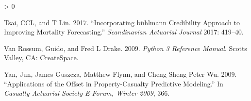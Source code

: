 \documentclass[
]{article}
\newlength{\cslhangindent}
\newenvironment{CSLReferences}[2] %
 {%
  \setlength{\parindent}{0pt}
  \ifodd #1 \everypar{\setlength{\hangindent}{\cslhangindent}}\ignorespaces\fi
  \ifnum #2 > 0
  \setlength{\parskip}{#2\baselineskip}
  \fi
 }%
 {}
\begin{document}
\begin{CSLReferences}{1}{0}
\leavevmode\hypertarget{ref-tsai2017incorporating}{}%
Tsai, CCL, and T Lin. 2017. {``Incorporating b{ü}hlmann Credibility
Approach to Improving Mortality Forecasting.''} \emph{Scandinavian
Actuarial Journal} 2017: 419--40.

\leavevmode\hypertarget{ref-python3}{}%
Van Rossum, Guido, and Fred L Drake. 2009. \emph{{Python 3 Reference
Manual}}. Scotts Valley, CA: CreateSpace.

\leavevmode\hypertarget{ref-yan_applications_2009}{}%
Yan, Jun, James Guszcza, Matthew Flynn, and Cheng-Sheng Peter Wu. 2009.
{``Applications of the Offset in Property-Casualty Predictive
Modeling.''} In \emph{Casualty {Actuarial} {Society} {E}-{Forum},
{Winter} 2009}, 366.

\end{CSLReferences}
\end{document}
